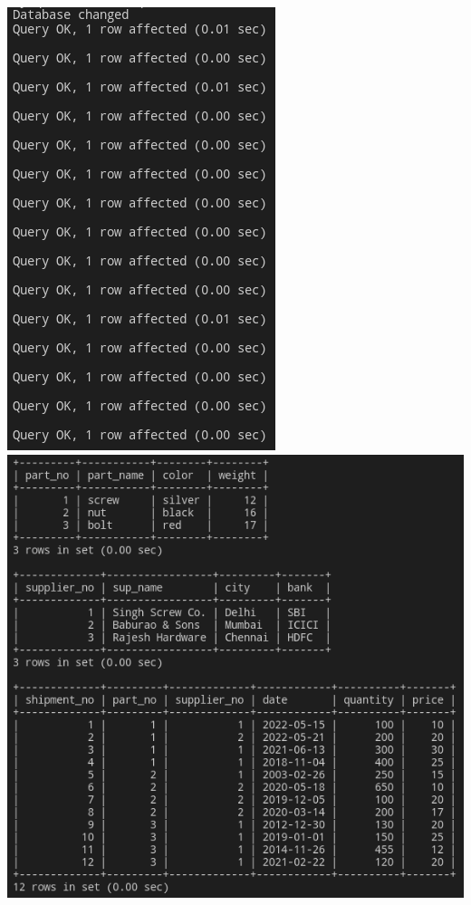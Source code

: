 \documentclass{article}
\begin{document}
\begin{center}
    \includegraphics[scale=0.6]{4i.png}
    \includegraphics[scale=0.6]{4ii.png}
\end{center}
\end{document}
